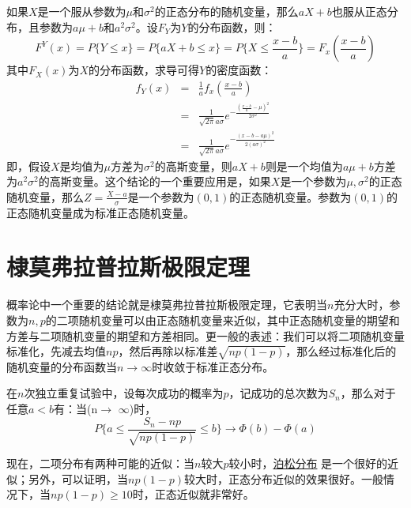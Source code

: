 \documentclass[11pt]{article}
\begin{document}
如果\(X\)是一个服从参数为\(\mu\)和\(\sigma^{2}\)的正态分布的随机变量，那么\(aX + b\)也服从正态分布，且参数为\(a\mu + b\)和\(a^{2}\sigma^{2}\)。设\(F_{Y}\)为\(Y\)的分布函数，则：
\begin{equation}
\label{eq:10}
F^{Y}(x) = P\{Y\leq x\} = P\{ aX + b \leq x\} = P\{ X \leq \frac{x-b}{a}\} = F_{x}(\frac{x-b}{a})
\end{equation}
其中\(F_{X}(x)\)为\(X\)的分布函数，求导可得\(Y\)的密度函数：
\begin{eqnarray}
\label{eq:11}
f_{Y}(x)&=& \frac{1}{a}f_{x}(\frac{x-b}{a}) \\
&=& \frac{1}{\sqrt{2\pi}a\sigma}e^{-\frac{ (\frac{x-b}{a}-\mu)^{2} }{2\sigma^{2}}} \\
&=& \frac{1}{\sqrt{2\pi}a\sigma}e^{-\frac{(x-b-a\mu)^{2}}{2(a\sigma)^{2}}}
\end{eqnarray}
即，假设\(X\)是均值为\(\mu\)方差为\(\sigma^{2}\)的高斯变量，则\(aX + b\)则是一个均值为\(a\mu + b\)方差为\(a^{2}\sigma^{2}\)的高斯变量。这个结论的一个重要应用是，如果\(X\)是一个参数为\(\mu,\sigma^{2}\)的正态随机变量，那么\(Z = \tfrac{X-a}{\sigma}\)是一个参数为\((0,1)\)的正态随机变量。参数为\((0,1)\)的正态随机变量成为标准正态随机变量。
\section{棣莫弗拉普拉斯极限定理}
\label{sec:org7b5385f}


概率论中一个重要的结论就是棣莫弗拉普拉斯极限定理，它表明当\(n\)充分大时，参数为\(n,p\)的二项随机变量可以由正态随机变量来近似，其中正态随机变量的期望和方差与二项随机变量的期望和方差相同。更一般的表述：我们可以将二项随机变量标准化，先减去均值\(np\)，然后再除以标准差\(\sqrt{np(1-p)}\)，那么经过标准化后的随机变量的分布函数当\(n\to \infty\)时收敛于标准正态分布。

\begin{tikztheorem}[棣莫弗拉普拉斯定理]
在\(n\)次独立重复试验中，设每次成功的概率为\(p\)，记成功的总次数为\(S_{n}\)，那么对于任意\(a < b\)有：当(n\(\to\) \(\infty\))时，
\begin{equation}
\label{eq:12}
P\bigg\{a\leq \frac{S_{n}-np}{\sqrt{np(1-p)}} \leq b\bigg\} \to \Phi(b) - \Phi(a)
\end{equation}
\end{tikztheorem}

现在，二项分布有两种可能的近似：当\(n\)较大\(p\)较小时，\href{poisson-distribution.org}{泊松分布} 是一个很好的近似；另外，可以证明，当\(np(1-p)\)较大时，正态分布近似的效果很好。一般情况下，当\(np(1-p) \geq 10\)时，正态近似就非常好。
\end{document}
